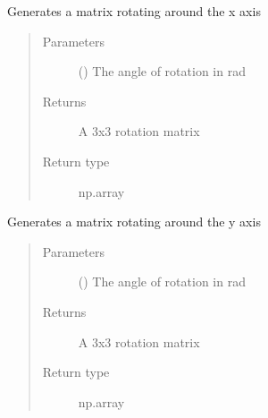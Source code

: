 \documentclass[letterpaper,10pt,english]{sphinxmanual}
\begin{document}
\begin{fulllineitems}
\label{\detokenize{code_docu:trip_kinematics.HomogenTransformationMatrix.x_axis_rotation_matrix}}
Generates a matrix rotating around the x axis
\begin{quote}\begin{description}
\item[{Parameters}] \leavevmode
{} () \textendash{} The angle of rotation in rad

\item[{Returns}] \leavevmode
A 3x3 rotation matrix

\item[{Return type}] \leavevmode
np.array

\end{description}\end{quote}

\end{fulllineitems}


\begin{fulllineitems}
\label{\detokenize{code_docu:trip_kinematics.HomogenTransformationMatrix.y_axis_rotation_matrix}}
Generates a matrix rotating around the y axis
\begin{quote}\begin{description}
\item[{Parameters}] \leavevmode
{} () \textendash{} The angle of rotation in rad

\item[{Returns}] \leavevmode
A 3x3 rotation matrix

\item[{Return type}] \leavevmode
np.array

\end{description}\end{quote}

\end{fulllineitems}
\end{document}
